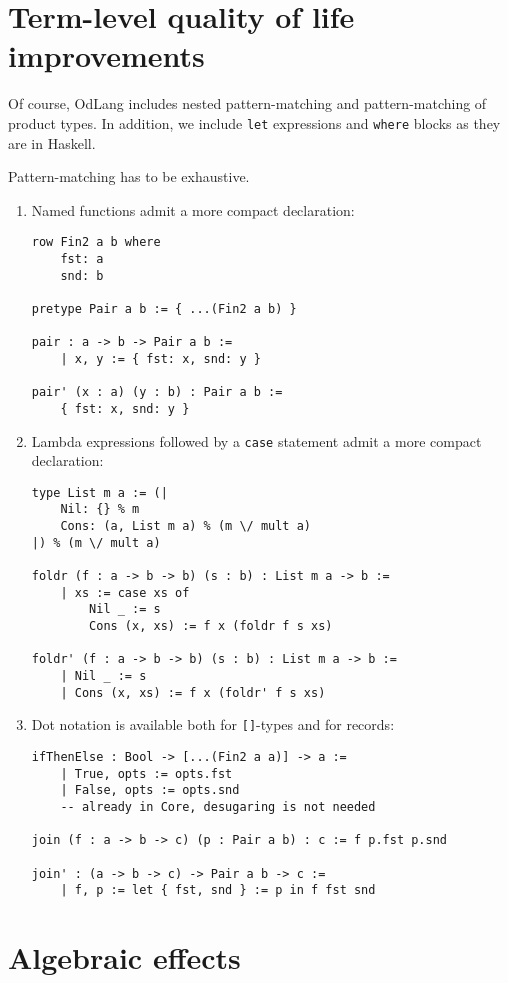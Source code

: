 \documentclass[a4paper,14pt]{extreport}
\begin{document}
\section{Term-level quality of life improvements}

Of course, OdLang includes nested pattern-matching and pattern-matching of
product types. In addition, we include \verb|let| expressions and \verb|where|
blocks as they are in Haskell.

Pattern-matching has to be exhaustive.

\begin{enumerate}
    \item Named functions admit a more compact declaration:
\begin{verbatim}
row Fin2 a b where
    fst: a
    snd: b

pretype Pair a b := { ...(Fin2 a b) }

pair : a -> b -> Pair a b :=
    | x, y := { fst: x, snd: y }

pair' (x : a) (y : b) : Pair a b :=
    { fst: x, snd: y }
\end{verbatim}
    \item Lambda expressions followed by a \verb|case| statement admit a more
        compact declaration:
\begin{verbatim}
type List m a := (|
    Nil: {} % m
    Cons: (a, List m a) % (m \/ mult a)
|) % (m \/ mult a)

foldr (f : a -> b -> b) (s : b) : List m a -> b :=
    | xs := case xs of
        Nil _ := s
        Cons (x, xs) := f x (foldr f s xs)

foldr' (f : a -> b -> b) (s : b) : List m a -> b :=
    | Nil _ := s
    | Cons (x, xs) := f x (foldr' f s xs)
\end{verbatim}
    \item Dot notation is available both for \verb|[]|-types and for records:
\begin{verbatim}
ifThenElse : Bool -> [...(Fin2 a a)] -> a :=
    | True, opts := opts.fst
    | False, opts := opts.snd
    -- already in Core, desugaring is not needed

join (f : a -> b -> c) (p : Pair a b) : c := f p.fst p.snd

join' : (a -> b -> c) -> Pair a b -> c :=
    | f, p := let { fst, snd } := p in f fst snd
\end{verbatim}
\end{enumerate}

\section{Algebraic effects}
\end{document}
